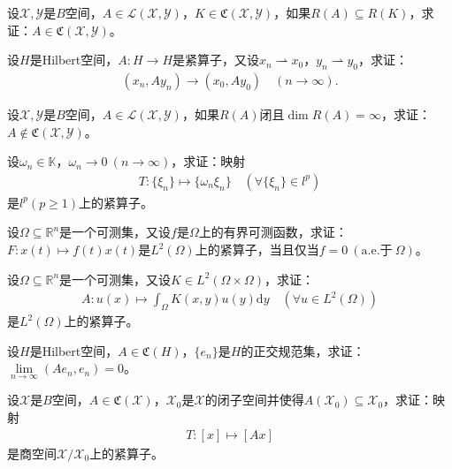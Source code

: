 \documentclass[../../main.tex]{subfiles}%
\begin{document}
\begin{example}
设$\mathscr{X},\mathscr{Y}$是$B$空间，$A\in\mathscr{L}(\mathscr{X},\mathscr{Y})$，$K\in\mathfrak{C}(\mathscr{X},\mathscr{Y})$，如果$R(A)\subseteq R(K)$，求证：$A\in\mathfrak{C}(\mathscr{X},\mathscr{Y})$。
\end{example}

\begin{example}
设$H$是Hilbert空间，$A:H\to H$是紧算子，又设$x_n\rightharpoonup x_0$，$y_n\rightharpoonup y_0$，求证：
\begin{align*}
(x_n,Ay_n)\to(x_0,Ay_0)\quad (n\to\infty).
\end{align*}
\end{example}

\begin{example}
设$\mathscr{X},\mathscr{Y}$是$B$空间，$A\in\mathscr{L}(\mathscr{X},\mathscr{Y})$，如果$R(A)$闭且$\dim R(A)=\infty$，求证：$A\notin\mathfrak{C}(\mathscr{X},\mathscr{Y})$。
\end{example}

\begin{example}
设$\omega_n\in\mathbb{K}$，$\omega_n\to0\ (n\to\infty)$，求证：映射
\begin{align*}
T:\{\xi_n\}\mapsto\{\omega_n\xi_n\}\quad (\forall\{\xi_n\}\in l^p)
\end{align*}
是$l^p(p\geqslant1)$上的紧算子。
\end{example}

\begin{example}
设$\Omega\subseteq\mathbb{R}^n$是一个可测集，又设$f$是$\Omega$上的有界可测函数，求证：$F:x(t)\mapsto f(t)x(t)$是$L^2(\Omega)$上的紧算子，当且仅当$f=0\ (\mathrm{a.e.}\text{于}\ \Omega)$。
\end{example}

\begin{example}
设$\Omega\subseteq\mathbb{R}^n$是一个可测集，又设$K\in L^2(\Omega\times\Omega)$，求证：
\begin{align*}
A:u(x)\mapsto\int_{\Omega}K(x,y)u(y)\mathrm{d}y\quad (\forall u\in L^2(\Omega))
\end{align*}
是$L^2(\Omega)$上的紧算子。
\end{example}

\begin{example}
设$H$是Hilbert空间，$A\in\mathfrak{C}(H)$，$\{e_n\}$是$H$的正交规范集，求证：$\lim\limits_{n\to\infty}(Ae_n,e_n)=0$。
\end{example}

\begin{example}
设$\mathscr{X}$是$B$空间，$A\in\mathfrak{C}(\mathscr{X})$，$\mathscr{X}_0$是$\mathscr{X}$的闭子空间并使得$A(\mathscr{X}_0)\subseteq\mathscr{X}_0$，求证：映射
\begin{align*}
T:[x]\mapsto[Ax]
\end{align*}
是商空间$\mathscr{X}/\mathscr{X}_0$上的紧算子。
\end{example}
\end{document}
